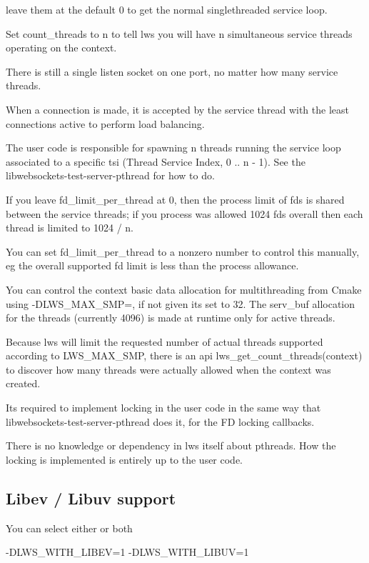 leave them at the default 0 to get the normal singlethreaded service loop.

Set count\+\_\+threads to n to tell lws you will have n simultaneous service threads operating on the context.

There is still a single listen socket on one port, no matter how many service threads.

When a connection is made, it is accepted by the service thread with the least connections active to perform load balancing.

The user code is responsible for spawning n threads running the service loop associated to a specific tsi (Thread Service Index, 0 .. n -\/ 1). See the libwebsockets-\/test-\/server-\/pthread for how to do.

If you leave fd\+\_\+limit\+\_\+per\+\_\+thread at 0, then the process limit of fds is shared between the service threads; if you process was allowed 1024 fds overall then each thread is limited to 1024 / n.

You can set fd\+\_\+limit\+\_\+per\+\_\+thread to a nonzero number to control this manually, eg the overall supported fd limit is less than the process allowance.

You can control the context basic data allocation for multithreading from Cmake using -\/\+D\+L\+W\+S\+\_\+\+M\+A\+X\+\_\+\+S\+MP=, if not given it\textquotesingle{}s set to 32. The serv\+\_\+buf allocation for the threads (currently 4096) is made at runtime only for active threads.

Because lws will limit the requested number of actual threads supported according to L\+W\+S\+\_\+\+M\+A\+X\+\_\+\+S\+MP, there is an api lws\+\_\+get\+\_\+count\+\_\+threads(context) to discover how many threads were actually allowed when the context was created.

It\textquotesingle{}s required to implement locking in the user code in the same way that libwebsockets-\/test-\/server-\/pthread does it, for the FD locking callbacks.

There is no knowledge or dependency in lws itself about pthreads. How the locking is implemented is entirely up to the user code.

\subsection*{Libev / Libuv support }

You can select either or both \begin{DoxyVerb}    -DLWS_WITH_LIBEV=1
    -DLWS_WITH_LIBUV=1
\end{DoxyVerb}


